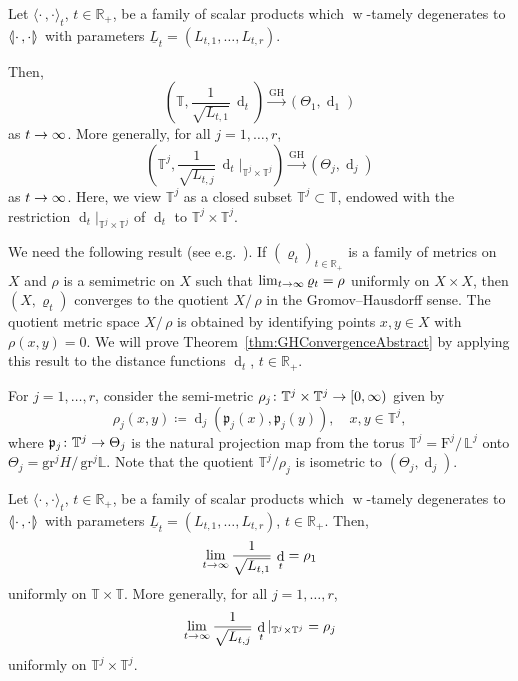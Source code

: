 \documentclass[AHL,Unicode,longabstracts]{cedram}
\newcommand{\innone}[2]{{\langle#2\rangle_{#1}}}
\newcommand{\llangle}{\mathopen{\langle\mkern -3.1mu\lvert}}
\newcommand{\rrangle}{\mathclose{\rvert\mkern -3.1mu\rangle}}
\newcommand{\highinn}[2]{{\llangle#2\rrangle_{#1}}}
\newcommand{\rest}[1]{\vert_{#1}}
\newcommand{\rquot}[2]{#1/\,#2}
\DeclareMathOperator{\weak}{w}
\DeclareMathOperator{\dist}{d}
\newcommand{\filter}{\mathrm{F}}
\newcommand{\R}{\mathbb{R}}
\newcommand{\T}{\mathbb{T}}
\renewcommand{\L}{\mathbb{L}}
\newcommand{\grm}[2]{\mathrm{gr}_{#1}^{#2}}
\newcommand{\proj}{\mathfrak{p}}
\newcommand{\GH}{\mathrm{GH}}
\renewcommand*{\to}{\mathchoice{\longrightarrow}{\rightarrow}{\rightarrow}{\rightarrow}}
\begin{document}
\begin{theo} \label{thm:GHConvergenceAbstract}
Let $\innone{t}{\cdot\,, \cdot}$, $t \in \R_+$, be a family of scalar products which $\weak$-tamely degenerates to $\highinn{}{\cdot\,, \cdot}$ with parameters $\underline L_t =(L_{t,1}, \dots, L_{t,r})$.

Then,
\[
\left(\T, \frac{1}{\sqrt{L_{t,1}}} \, \dist_t \right) \xrightarrow{\GH} \left(\Theta_{1}, \dist_{1} \right)
\]
as $t \to \infty$. More generally, for all $j=1, \dots, r$,
\[
\left(\T^j,\frac{1}{\sqrt{L_{t,j}}} \,\dist_t |_{\T^j\times \T^j} \right) \xrightarrow{\GH} \left(\Theta_{j}, \dist_{j} \right)
\]
as $t \to \infty$. Here, we view $\T^j$ as a closed subset $\T^j \subset \T$, endowed with the restriction $\dist_t \rest{\T^j\times \T^j}$ of $\dist_t$ to $\T^j\times \T^j$.
\end{theo} We need the following result (see e.g.~\cite[Example~7.4.4]{Burago}). If $(\varrho_t)_{t \in \R_+}$ is a family of metrics on $X$ and $\rho$ is a semimetric on $X$ such that $\lim_{t \to \infty} \varrho_t = \rho$ uniformly on $X \times X$, then $(X, \varrho_t)$ converges to the quotient $\rquot{X}{\rho}$ in the Gromov--Hausdorff sense. The quotient metric space $\rquot{X}{\rho}$ is obtained by identifying points $x,y \in X$ with $\rho(x,y) = 0$. We will prove Theorem~\ref{thm:GHConvergenceAbstract} by applying this result to the distance functions $\dist_t$, $t \in \R_+$.

For $j = 1, \dots, r$, consider the semi-metric $\rho_j \colon \T^j \times \T^j \to [0, \infty)$ given by
\[
\rho_j(x,y) \coloneqq \dist_{j}(\proj_j(x), \proj_j(y)), \quad x,y \in \T^j,
\]
where $\proj_j \colon \T^j \to \Theta_j$ is the natural projection map from  the torus $\T^j = \rquot{\filter^j}{\L^j}$ onto $\Theta_{j} = \rquot{\grm{}{j} H}{\grm{}{j} \L}$. Note that the quotient $\T^j / \rho_j$ is isometric to $(\Theta_j, \dist_j)$.



\begin{lemm} \label{lem:ConvergenceDistanceFunction}
Let $\innone{t}{\cdot\,, \cdot}$, $t \in \R_+$, be a family of scalar products which $\weak$-tamely degenerates to $\highinn{}{\cdot\,, \cdot}$ with parameters $\underline L_t =(L_{t,1}, \dots, L_{t,r})$, $t \in \R_+$. Then,
\[
\lim_{t \to \infty} \frac{1}{\sqrt{L_{t,1}}} \, \dist_t = \rho_1
\]
uniformly on $\T \times \T$. More generally, for all $j =1, \dots, r$,
\[
\lim_{t \to \infty} \frac{1}{\sqrt{L_{t,j}}} \,\dist_t |_{\T^j\times \T^j} = \rho_j
\]
uniformly on $\T^j \times \T^j$.
\end{lemm}
\end{document}
